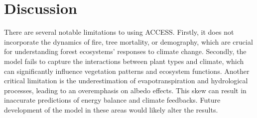 \documentclass[]{article}
\begin{document}
\section{Discussion}



%
%
%

There are several notable limitations to using ACCESS.
Firstly, it does not incorporate the dynamics of fire, tree mortality, or demography, which are crucial for understanding forest ecosystems' responses to climate change.
Secondly, the model fails to capture the interactions between plant types and climate, which can significantly influence vegetation patterns and ecosystem functions.
Another critical limitation is the underestimation of evapotranspiration and hydrological processes, leading to an overemphasis on albedo effects.
This skew can result in inaccurate predictions of energy balance and climate feedbacks.
Future development of the model in these areas would likely alter the results.
\end{document}
